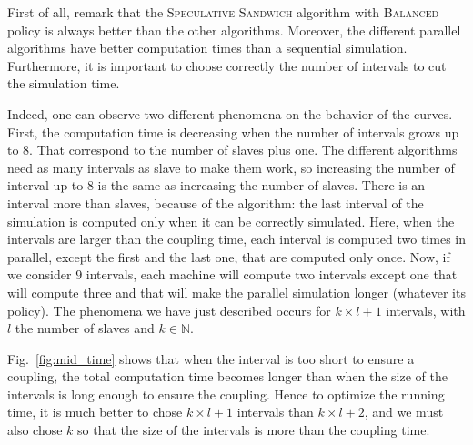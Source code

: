 \documentclass[a4paper,10pt]{article}
\begin{document}
First of all, remark that the \textsc{Speculative Sandwich} algorithm with \textsc{Balanced} policy is always better than the other algorithms. Moreover, the different parallel algorithms have better computation times than a sequential simulation. Furthermore, it is important to choose correctly the number of intervals to cut the simulation time.


Indeed, one can observe two different phenomena on the behavior of the curves.
First, the computation time is decreasing when the number of intervals grows up to $8$. That correspond to the number of slaves plus one. The different algorithms need as many intervals as slave to make them work, so increasing the number of interval up to $8$
is the same as increasing the number of slaves. There is an interval more than slaves, because of the algorithm: the last interval of the simulation is computed only when it can be correctly simulated. Here, when the intervals are larger than the coupling time, each interval is computed two times in parallel, except the first and the last one, that are computed only once. 
Now, if we consider $9$ intervals, each machine will compute two intervals except one that will compute three and that will make the 
parallel simulation longer (whatever its policy). The phenomena we have just described occurs for $k \times l + 1$ intervals, with $l$ the number of slaves and $k\in \mathbb{N}$.

Fig.~\ref{fig:mid_time} shows that when the interval is too short to ensure a coupling, the total computation time becomes longer than when the size of the intervals is long enough to ensure the coupling. Hence to optimize the running time, it is much better to chose $k \times l +1$ intervals than $k \times l +2$, and we must also chose $k$ so that the size of the intervals is more than the coupling time. 

% 
% 
    
\end{document}
